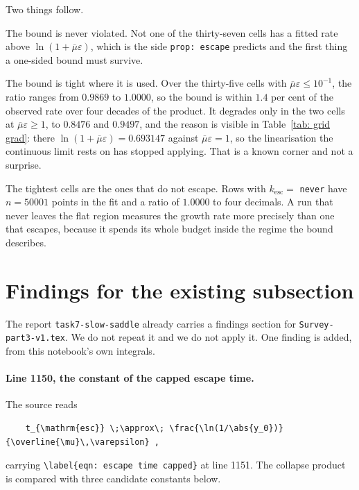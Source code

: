 \documentclass[11pt,a4paper]{article}
\providecommand{\abs}[1]{\left \vert #1 \right \vert}
\theoremstyle{definition}
\theoremstyle{remark}
\begin{document}
Two things follow.

The bound is never violated. Not one of the thirty-seven cells has a fitted rate
above $\ln(1+\overline{\mu}\varepsilon)$, which is the side
\texttt{prop: escape} predicts and the first thing a one-sided bound must
survive.

The bound is tight where it is used. Over the thirty-five cells with
$\overline{\mu}\varepsilon \leq 10^{-1}$, the ratio ranges from $0.9869$ to
$1.0000$, so the bound is within $1.4$ per cent of the observed rate over four
decades of the product. It degrades only in the two cells at
$\overline{\mu}\varepsilon \geq 1$, to $0.8476$ and $0.9497$, and the reason is
visible in Table~\ref{tab: grid grad}: there $\ln(1+\overline{\mu}\varepsilon) =
0.693147$ against $\overline{\mu}\varepsilon = 1$, so the linearisation the
continuous limit rests on has stopped applying. That is a known corner and not a
surprise.

The tightest cells are the ones that do not escape. Rows with
$k_{\mathrm{esc}} = $ \texttt{never} have $n = 50001$ points in the fit and a
ratio of $1.0000$ to four decimals. A run that never leaves the flat region
measures the growth rate more precisely than one that escapes, because it spends
its whole budget inside the regime the bound describes.

\section{Findings for the existing subsection}\label{sec: findings}

The report \texttt{task7-slow-saddle} already carries a findings section for
\texttt{Survey-part3-v1.tex}. We do not repeat it and we do not apply it. One
finding is added, from this notebook's own integrals.

\paragraph{Line 1150, the constant of the capped escape time.}
The source reads
\begin{verbatim}
    t_{\mathrm{esc}} \;\approx\; \frac{\ln(1/\abs{y_0})}{\overline{\mu}\,\varepsilon} ,
\end{verbatim}
carrying \verb|\label{eqn: escape time capped}| at line 1151. The collapse
product is compared with three candidate constants below.
\end{document}
